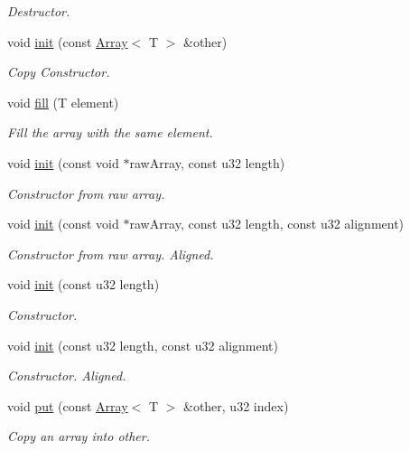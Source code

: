 \begin{DoxyCompactItemize}
\begin{DoxyCompactList}\small\item\em Destructor. \end{DoxyCompactList}\item 
void \hyperlink{classDE_1_1Array_a160b6d7bde381664d3a77c7bc72c7126}{init} (const \hyperlink{classDE_1_1Array}{Array}$<$ T $>$ \&other)
\begin{DoxyCompactList}\small\item\em Copy Constructor. \end{DoxyCompactList}\item 
void \hyperlink{classDE_1_1Array_a9e73e8109d4a8e1839c45f2443eb5f39}{fill} (T element)
\begin{DoxyCompactList}\small\item\em Fill the array with the same element. \end{DoxyCompactList}\item 
void \hyperlink{classDE_1_1Array_a9399e75853d0c2f946ad23ceeccf6309}{init} (const void $\ast$raw\+Array, const u32 length)
\begin{DoxyCompactList}\small\item\em Constructor from raw array. \end{DoxyCompactList}\item 
void \hyperlink{classDE_1_1Array_a424ca2b24f97dd2d0a23626b54405476}{init} (const void $\ast$raw\+Array, const u32 length, const u32 alignment)
\begin{DoxyCompactList}\small\item\em Constructor from raw array. Aligned. \end{DoxyCompactList}\item 
void \hyperlink{classDE_1_1Array_aca022d4ff92293f46a634260cb3fd9ed}{init} (const u32 length)
\begin{DoxyCompactList}\small\item\em Constructor. \end{DoxyCompactList}\item 
void \hyperlink{classDE_1_1Array_a5d03e54b2b7cc4b46b1c7c311f1b23c4}{init} (const u32 length, const u32 alignment)
\begin{DoxyCompactList}\small\item\em Constructor. Aligned. \end{DoxyCompactList}\item 
void \hyperlink{classDE_1_1Array_a2b0b137f752a2cf067359581e95bcd46}{put} (const \hyperlink{classDE_1_1Array}{Array}$<$ T $>$ \&other, u32 index)
\begin{DoxyCompactList}\small\item\em Copy an array into other. \end{DoxyCompactList}\item 

\end{DoxyCompactItemize}
